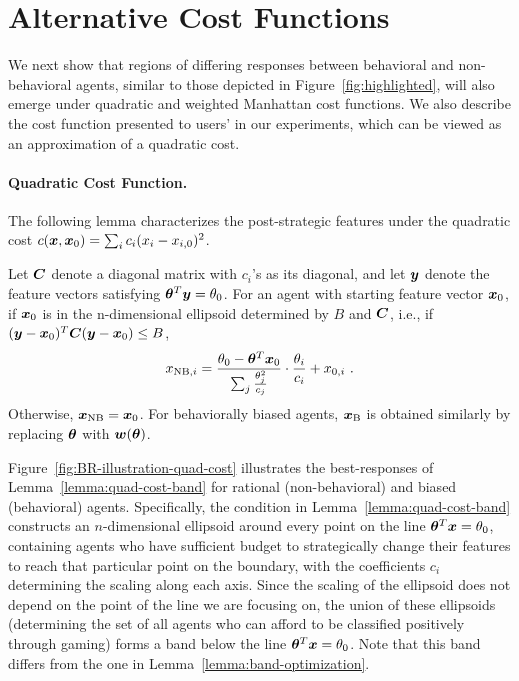 \section{Alternative Cost Functions}\label{app:alternative_costs}

We next show that regions of differing responses between behavioral and non-behavioral agents, similar to those depicted in Figure~\ref{fig:highlighted}, will also emerge under quadratic and weighted Manhattan cost functions. We also describe the cost function presented to users' in our experiments, which can be viewed as an approximation of a quadratic cost.

\paragraph{Quadratic Cost Function.}
The following lemma characterizes the post-strategic features under the quadratic cost $c({\bm{x}}, {\bm{x}}_0)=\sum_i c_i(x_{i}-x_{i,0})^2$.
\begin{lemma}\label{lemma:quad-cost-band}
    Let ${\bm{C}}$ denote a diagonal matrix with $c_i$'s as its diagonal, and let ${\bm{y}}$ denote the feature vectors satisfying ${\bm{\theta}}^T{\bm{y}} = \theta_0$. For an agent with starting feature vector ${\bm{x}}_0$, if ${\bm{x}}_0$ is in the n-dimensional ellipsoid determined by $B$ and ${\bm{C}}$, i.e., if $({\bm{y}}-{\bm{x}}_0)^T{\bm{C}} ({\bm{y}}-{\bm{x}}_0)\le B$,
    \begin{align*}
        x_{\text{NB}, i} = \frac{\theta_{0}-{\bm{\theta}}^T{\bm{x}}_0}{\sum_j \frac{\theta_j^2}{c_j}}\cdot \frac{\theta_i}{c_i}+x_{0,i}~.
    \end{align*}
    Otherwise, ${\bm{x}}_\text{NB}={\bm{x}}_0$. For behaviorally biased agents, ${\bm{x}}_\text{B}$ is obtained similarly by replacing ${\bm{\theta}}$ with ${\bm{w}}({\bm{\theta}})$.
\end{lemma}

Figure~\ref{fig:BR-illustration-quad-cost} illustrates the best-responses of Lemma~\ref{lemma:quad-cost-band} for rational (non-behavioral) and biased (behavioral) agents. Specifically, the condition in Lemma~\ref{lemma:quad-cost-band} constructs an $n$-dimensional ellipsoid around every point on the line ${\bm{\theta}}^T{\bm{x}} = \theta_{0}$, containing agents who have sufficient budget to strategically change their features to reach that particular point on the boundary, with the coefficients $c_i$ determining the scaling along each axis. %
Since the scaling of the ellipsoid does not depend on the point of the line we are focusing on, the union of these ellipsoids (determining the set of all agents who can afford to be classified positively through gaming) forms a band below the line ${\bm{\theta}}^T{\bm{x}}=\theta_0$. Note that this band differs from the one in Lemma~\ref{lemma:band-optimization}. 

